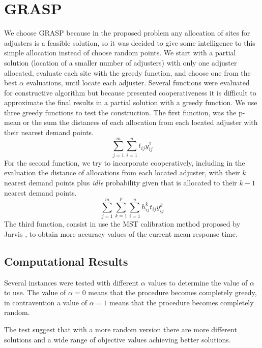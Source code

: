 \section{GRASP}
We choose GRASP
because
in the proposed problem
any allocation of sites for adjusters
is a feasible solution,
so it was decided to give some intelligence
to this simple allocation
instead of choose
random points.
We start with a partial solution
(location of a smaller number of adjusters)
with only one adjuster allocated,
evaluate each site with the greedy function,
and choose one from the best $\alpha$ evaluations,
until locate each adjuster.
Several functions were evaluated
for constructive algorithm
but because presented cooperativeness
it is difficult
to approximate the final results
in a partial solution
with a greedy function.
We use three greedy functions
to test the construction.
The first function,
was the p-mean
or the sum the distances
of each allocation 
from each located adjuster
with their nearest demand points.
\begin{equation}
  \label{eq:grasp1}
  \sum_{j=1}^{m}{
    \sum_{i=1}^{n}{
      t_{ij}y_{ij}^{1}
    }
  }
\end{equation}
For the second function,
we try to incorporate cooperatively,
including in the evaluation
the distance of allocations
from each located adjuster,
with their $k$ nearest demand points
plus \textit{idle} probability
given that is allocated
to their $k-1$ nearest demand points.
\begin{equation}
  \label{eq:grasp2}
  \sum_{j=1}^{m}{
    \sum_{k=1}^{p}{
      \sum_{i=1}^{n}{
        h_{ij}^{k}t_{ij}y_{ij}^{k}
      }
    }
  }
\end{equation}
The third function,
consist in use the MST calibration method
proposed by Jarvis \cite{jarvis1985approximating},
to obtain more accuracy values
of the current mean response time.

\subsection{Computational Results}
Several instances were tested
with different $\alpha$ values
to determine the value of $\alpha$ to use.
The value of $\alpha = 0$ means that
the procedure becomes completely greedy,
in contravention
a value of $\alpha = 1$ means that
the procedure becomes completely random.

The test suggest
that
with a more random version
there are more different solutions
and a wide range of objective values
achieving better solutions.
